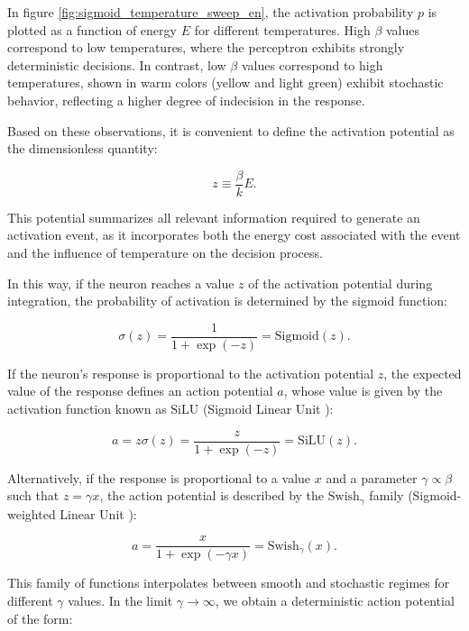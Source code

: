 \documentclass[12pt]{article}
\begin{document}
In figure \ref{fig:sigmoid_temperature_sweep_en}, the activation probability $p$ is plotted as a function of energy $E$ for different temperatures. High $\beta$ values correspond to low temperatures, where the perceptron exhibits strongly deterministic decisions. In contrast, low $\beta$ values correspond to high temperatures, shown in warm colors (yellow and light green) exhibit stochastic behavior, reflecting a higher degree of indecision in the response.

Based on these observations, it is convenient to define the activation potential as the dimensionless quantity:

\begin{equation}
z \equiv \frac{\beta}{k} E.
\end{equation}

This potential summarizes all relevant information required to generate an activation event, as it incorporates both the energy cost associated with the event and the influence of temperature on the decision process. 

In this way, if the neuron reaches a value $z$ of the activation potential during integration, the probability of activation is determined by the sigmoid function:

\begin{equation}
\sigma(z) = \frac{1}{1+\exp(-z)} = \text{Sigmoid}(z).
\end{equation}

If the neuron’s response is proportional to the activation potential $z$, the expected value of the response defines an action potential $a$, whose value is given by the activation function known as $\text{SiLU}$ (Sigmoid Linear Unit  \cite{elfwing2018sigmoid}):

\begin{equation}
a = z \sigma(z) = \frac{z}{1+\exp(-z)} = \text{SiLU}(z).
\end{equation}

Alternatively, if the response is proportional to a value $x$ and a parameter $\gamma \propto \beta$ such that $z = \gamma x$, the action potential is described by the $\text{Swish}_{\gamma}$ family (Sigmoid-weighted Linear Unit \cite{ramachandran2017swish}):

\begin{equation}
a = \frac{x}{1+\exp(-\gamma x)} = \text{Swish}_{\gamma}(x).
\end{equation}

This family of functions interpolates between smooth and stochastic regimes for different $\gamma$ values. In the limit $\gamma \rightarrow \infty$, we obtain a deterministic action potential of the form:
\end{document}
